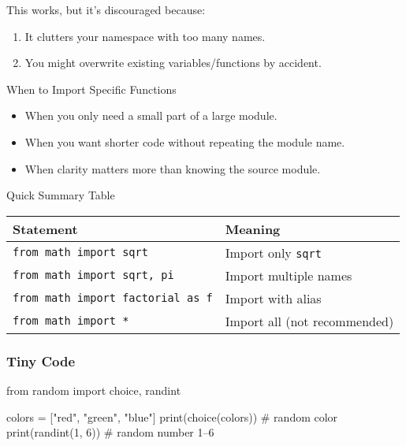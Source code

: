 \documentclass[
  letterpaper,
  DIV=11,
  numbers=noendperiod]{scrreprt}
\newenvironment{Shaded}{\begin{snugshade}}{\end{snugshade}}
\newcommand{\BuiltInTok}[1]{\textcolor[rgb]{0.00,0.23,0.31}{#1}}
\newcommand{\CommentTok}[1]{\textcolor[rgb]{0.37,0.37,0.37}{#1}}
\newcommand{\DecValTok}[1]{\textcolor[rgb]{0.68,0.00,0.00}{#1}}
\newcommand{\ImportTok}[1]{\textcolor[rgb]{0.00,0.46,0.62}{#1}}
\newcommand{\NormalTok}[1]{\textcolor[rgb]{0.00,0.23,0.31}{#1}}
\newcommand{\OperatorTok}[1]{\textcolor[rgb]{0.37,0.37,0.37}{#1}}
\newcommand{\StringTok}[1]{\textcolor[rgb]{0.13,0.47,0.30}{#1}}
\providecommand{\tightlist}{%
  \setlength{\itemsep}{0pt}\setlength{\parskip}{0pt}}
\begin{document}
This works, but it's discouraged because:

\begin{enumerate}
\def\labelenumi{\arabic{enumi}.}
\tightlist
\item
  It clutters your namespace with too many names.
\item
  You might overwrite existing variables/functions by accident.
\end{enumerate}

When to Import Specific Functions

\begin{itemize}
\tightlist
\item
  When you only need a small part of a large module.
\item
  When you want shorter code without repeating the module name.
\item
  When clarity matters more than knowing the source module.
\end{itemize}

Quick Summary Table

\begin{longtable}[]{@{}ll@{}}
\toprule\noalign{}
Statement & Meaning \\
\midrule\noalign{}
\endhead
\bottomrule\noalign{}
\endlastfoot
\texttt{from\ math\ import\ sqrt} & Import only \texttt{sqrt} \\
\texttt{from\ math\ import\ sqrt,\ pi} & Import multiple names \\
\texttt{from\ math\ import\ factorial\ as\ f} & Import with alias \\
\texttt{from\ math\ import\ *} & Import all (not recommended) \\
\end{longtable}

\subsubsection{Tiny Code}\label{tiny-code-43}

\begin{Shaded}
\begin{Highlighting}[]
\ImportTok{from}\NormalTok{ random }\ImportTok{import}\NormalTok{ choice, randint}

\NormalTok{colors }\OperatorTok{=}\NormalTok{ [}\StringTok{"red"}\NormalTok{, }\StringTok{"green"}\NormalTok{, }\StringTok{"blue"}\NormalTok{]}
\BuiltInTok{print}\NormalTok{(choice(colors))       }\CommentTok{\# random color}
\BuiltInTok{print}\NormalTok{(randint(}\DecValTok{1}\NormalTok{, }\DecValTok{6}\NormalTok{))        }\CommentTok{\# random number 1–6}
\end{Highlighting}
\end{Shaded}
\end{document}
